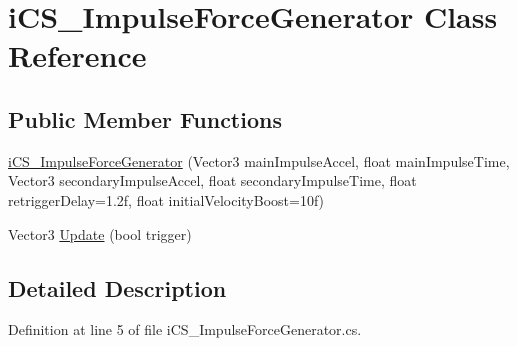 \hypertarget{classi_c_s___impulse_force_generator}{\section{i\+C\+S\+\_\+\+Impulse\+Force\+Generator Class Reference}
\label{classi_c_s___impulse_force_generator}
}
\subsection*{Public Member Functions}
\begin{DoxyCompactItemize}
\item 
\hyperlink{classi_c_s___impulse_force_generator_a98be9136d17b7dc1bb2e3615efeab19e}{i\+C\+S\+\_\+\+Impulse\+Force\+Generator} (Vector3 main\+Impulse\+Accel, float main\+Impulse\+Time, Vector3 secondary\+Impulse\+Accel, float secondary\+Impulse\+Time, float retrigger\+Delay=1.\+2f, float initial\+Velocity\+Boost=10f)
\item 
Vector3 \hyperlink{classi_c_s___impulse_force_generator_a7613f26fe1128ae462057137427b0f82}{Update} (bool trigger)
\end{DoxyCompactItemize}


\subsection{Detailed Description}


Definition at line 5 of file i\+C\+S\+\_\+\+Impulse\+Force\+Generator.\+cs.



